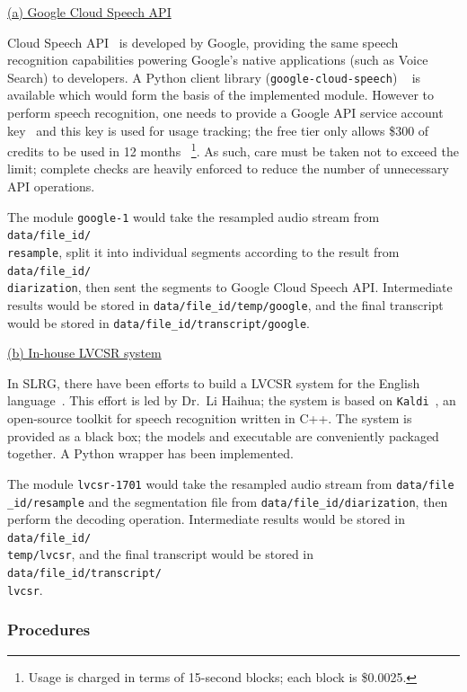 \underline{(a) Google Cloud Speech API}

Cloud Speech API~\cite{gcs} is developed by Google, providing the same speech
recognition capabilities powering Google's native applications (such as Voice
Search) to developers. A Python client library (\texttt{google-cloud-speech})
~\cite{gh-gcs} is available which would form the basis of the implemented module.
However to perform speech recognition, one needs to provide a Google API service
account key~\cite{gcs-api-key} and this key is used for usage tracking; the free
tier only allows \$300 of credits to be used in 12 months~\cite{gcs-free}
\footnote{Usage is charged in terms of 15-second blocks; each block is \$0.0025.}.
As such, care must be taken not to exceed the limit; complete checks are heavily
enforced to reduce the number of unnecessary API operations.

The module \texttt{google-1} would take the resampled audio stream from
\texttt{data/file\_id/\\ resample}, split it into individual segments according
to the result from \texttt{data/file\_id/\\diarization}, then sent the segments
to Google Cloud Speech API\@. Intermediate results would be stored in
\texttt{data/file\_id/temp/google}, and the final transcript would be stored in
\texttt{data/file\_id/transcript/google}.

\underline{(b) In-house LVCSR system}

In SLRG, there have been efforts to build a LVCSR system for the English
language~\cite{slrg}. This effort is led by Dr.\ Li Haihua; the system is based
on \texttt{Kaldi}~\cite{Povey_ASRU2011}, an open-source toolkit for speech
recognition written in C++. The system is provided as a black box; the models
and executable are conveniently packaged together. A Python wrapper has been
implemented.

The module \texttt{lvcsr-1701} would take the resampled audio stream from
\texttt{data/file\\ \_id/resample} and the segmentation file from
\texttt{data/file\_id/diarization}, then perform the decoding operation.
Intermediate results would be stored in \texttt{data/file\_id/\\ temp/lvcsr},
and the final transcript would be stored in
\texttt{data/file\_id/transcript/\\lvcsr}.

\subsubsection{Procedures}

